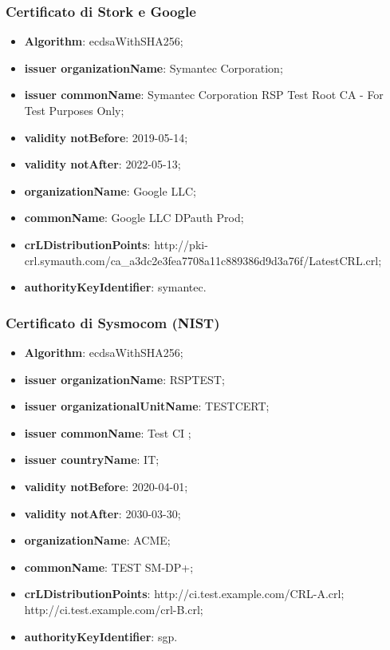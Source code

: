 \documentclass[10pt, oneside]{book}
\begin{document}
\subsubsection{Certificato di Stork e Google}
\begin{itemize}
\item \textbf{Algorithm}: ecdsaWithSHA256;
\item \textbf{issuer organizationName}: Symantec Corporation;
\item \textbf{issuer commonName}: Symantec Corporation RSP Test Root CA - For Test Purposes Only;
\item \textbf{validity notBefore}: 2019-05-14;
\item \textbf{validity notAfter}: 2022-05-13;
\item \textbf{organizationName}: Google LLC;
\item \textbf{commonName}: Google LLC DPauth Prod;
\item \textbf{crLDistributionPoints}: http://pki-crl.symauth.com/ca\_a3dc2e3fea7708a11c889386d9d3a76f/LatestCRL.crl;
\item \textbf{authorityKeyIdentifier}: symantec.
\end{itemize}

\subsubsection{Certificato di Sysmocom (NIST)}
\begin{itemize}
\item \textbf{Algorithm}: ecdsaWithSHA256;
\item \textbf{issuer organizationName}: RSPTEST;
\item \textbf{issuer organizationalUnitName}: TESTCERT;
\item \textbf{issuer commonName}: Test CI ;
\item \textbf{issuer countryName}: IT;
\item \textbf{validity notBefore}: 2020-04-01;
\item \textbf{validity notAfter}: 2030-03-30;
\item \textbf{organizationName}: ACME;
\item \textbf{commonName}: TEST SM-DP+;
\item \textbf{crLDistributionPoints}: http://ci.test.example.com/CRL-A.crl;\\http://ci.test.example.com/crl-B.crl;
\item \textbf{authorityKeyIdentifier}: sgp.
\end{itemize}
\end{document}
